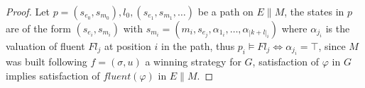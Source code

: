 \begin{proof}\label{def:strat_soundness_proof}
	Let $p=(s_{e_0},s_{m_0}),l_0,(s_{e_1},s_{m_1},\ldots)$ be a path on $E \parallel M$, the states in
	$p$ are of the form $(s_{e_i},s_{m_i})$ with $s_{m_i}=(m_i,s_{e_j},\alpha_{1_i},\ldots,\alpha_{|k+l|_i})$ where $\alpha_{j_i}$ is the valuation of fluent $Fl_j$ at position $i$ in the path, thus $p_i \models Fl_j \iff \alpha_{j_i} = \top$, since $M$ was built following $f=(\sigma,u)$ a winning strategy for $G$, satisfaction of $\varphi$ in $G$ implies satisfaction of $fluent(\varphi)$ in $E \parallel M$.
\end{proof}